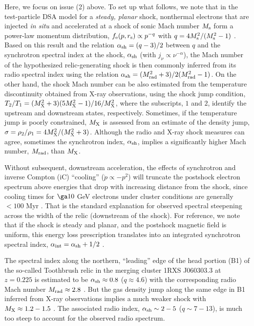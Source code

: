 \documentclass[twocolumn]{aastex61}
\begin{document}
Here, we focus on issue (2) above. To set up what follows, we note that in the test-particle DSA model for a {\it steady, planar} shock, nonthermal electrons that are injected {\it in situ} and accelerated at
a shock of sonic Mach number $M_{\rm s}$ form a power-law momentum distribution,
$f_{\rm e}(p,r_{\rm s})\propto p^{-q}$ with $q = 4M_{\rm s}^2/(M_{\rm s}^2-1)$ \citep{dru83}.
Based on this result and the relation $\alpha_{\rm sh} = (q-3)/2$ between $q$ and the synchrotron spectral index at the shock, $\alpha_{\rm sh}$ (with $j_{\nu} \propto \nu^{-\alpha}$), the Mach number of the hypothesized relic-generating shock is then commonly inferred from its radio spectral index 
using the relation $\alpha_{\rm sh} = (M_{\rm rad}^2+3)/2(M_{\rm rad}^2-1)$.
On the other hand, the shock Mach number can be also estimated from the temperature discontinuity obtained from X-ray observations,
using the shock jump condition, $T_2/T_1=(M_{\rm X}^2+3)(5M_{\rm X}^2-1)/16/M_{\rm X}^2$, where the subscripts, $1$ and $2$, identify the upstream and downstream states, respectively. 
Sometimes, if the temperature jump is poorly constrained, $M_{\rm X}$ is assessed from an estimate of the density jump, $\sigma = \rho_2/\rho_1 = 4 M_{\rm X}^2/(M_{\rm X}^2+3)$. Although the radio and X-ray shock measures can agree, sometimes the synchrotron index, $\alpha_{\rm sh}$, implies a significantly higher Mach number, $M_{\rm rad}$, than $M_{\rm X}$.

Without subsequent, downstream acceleration, the effects of synchrotron and inverse Compton (iC) ``cooling'' ($\dot {p} \propto - p^2$) will truncate the postshock electron spectrum above energies that drop with increasing distance from the shock, since cooling times for $\ga 10$ GeV electrons under cluster conditions are generally $< 100$ Myr \citep[e.g.,][]{brunetti2014}. That is the standard explanation for observed spectral steepening across the width of the relic (downstream of the shock). For reference, we note that if the shock is steady and planar, and the postshock magnetic field is uniform, this energy loss prescription translates into an integrated synchrotron spectral index, $\alpha_{\rm int} = \alpha_{\rm sh} + 1/2$ \citep{heavens87}.

The spectral index along the northern, ``leading'' edge of
the head portion (B1) of the so-called Toothbrush relic in the merging cluster 1RXS J060303.3 at $z=0.225$ is estimated to be $\alpha_{\rm sh}\approx 0.8$ ($q \approx 4.6$) with 
the corresponding radio Mach number $M_{\rm rad}\approx 2.8$ \citep{vanweeren16}.
But the gas density jump along the same edge in B1 inferred from X-ray observations implies a much weaker shock with $M_{\rm X}\approx 1.2-1.5$ \citep{vanweeren16}. The associated radio index, $\alpha_{\rm sh} \sim 2 - 5$ ($q \sim 7 - 13$), is much too steep to account for the observed radio spectrum.
\end{document}
